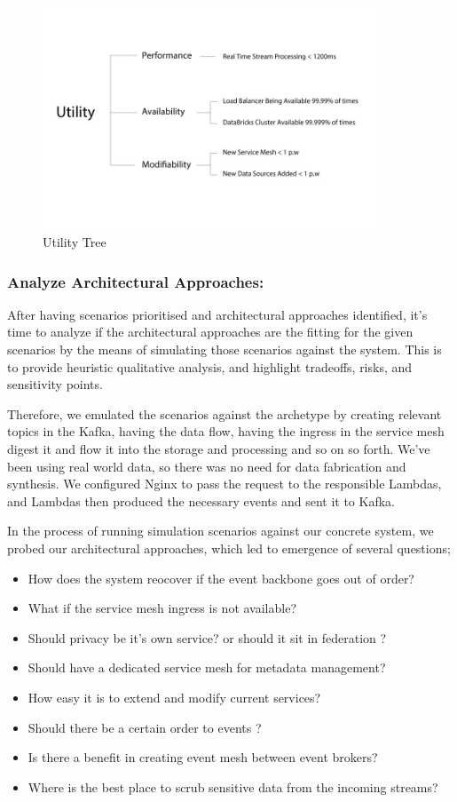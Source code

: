 \documentclass[review]{elsarticle}
\begin{document}
\begin{figure}[h!]
    \centering
    \includegraphics[width=10cm]{Media/Utility-tree.jpg}
    \caption{Utility Tree}
    \label{fig:utility-tree}
\end{figure}

\subsubsection{Analyze Architectural Approaches:}

After having scenarios prioritised and architectural approaches identified, it's time to analyze if the architectural approaches are the fitting for the given scenarios by the means of simulating those scenarios against the system. This is to provide heuristic qualitative analysis, and highlight tradeoffs, risks, and sensitivity points.

Therefore, we emulated the scenarios against the archetype by creating relevant topics in the Kafka, having the data flow, having the ingress in the service mesh digest it and flow it into the storage and processing and so on so forth. We've been using real world data, so there was no need for data fabrication and synthesis.  We configured Nginx to pass the request to the responsible Lambdas, and Lambdas then produced the necessary events and sent it to Kafka.

In the process of running simulation scenarios against our concrete system, we probed our architectural approaches, which led to emergence of several questions;

\begin{itemize}
    \item How does the system reocover if the event backbone goes out of order?
    \item What if the service mesh ingress is not available?
    \item Should privacy be it's own service? or should it sit in federation ?
    \item Should have a dedicated service mesh for metadata management?
    \item How easy it is to extend and modify current services?
    \item Should there be a certain order to events ?
    \item Is there a benefit in creating event mesh between event brokers?
    \item Where is the best place to scrub sensitive data from the incoming streams?
\end{itemize}
\end{document}
